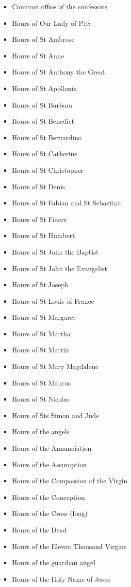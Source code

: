 \documentclass[a4paper,12pt,twoside]{book}
\begin{document}
	\begin{multicols}{2}
	\begin{itemize}
\item Common office of the confessors
\item Hours of Our Lady of Pity
\item Hours of St Ambrose
\item Hours of St Anne
\item Hours of St Anthony the Great
\item Hours of St Apollonia
\item Hours of St Barbara
\item Hours of St Benedict
\item Hours of St Bernardino
\item Hours of St Catherine
\item Hours of St Christopher
\item Hours of St Denis
\item Hours of St Fabian and St Sebastian
\item Hours of St Fiacre
\item Hours of St Humbert
\item Hours of St John the Baptist
\item Hours of St John the Evangelist
\item Hours of St Joseph
\item Hours of St Louis of France
\item Hours of St Margaret
\item Hours of St Martha
\item Hours of St Martin
\item Hours of St Mary Magdalene
\item Hours of St Maurus
\item Hours of St Nicolas
\item Hours of Sts Simon and Jude
\item Hours of the angels
\item Hours of the Annunciation
\item Hours of the Assumption
\item Hours of the Compassion of the Virgin
\item Hours of the Conception
\item Hours of the Cross (long)
\item Hours of the Dead
\item Hours of the Eleven Thousand Virgins
\item Hours of the guardian angel
\item Hours of the Holy Name of Jesus

\end{itemize}
\end{multicols}
\end{document}
